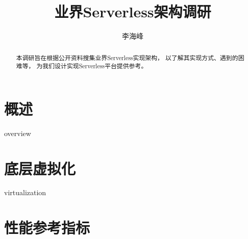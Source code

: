 \documentclass{scrartcl}
\title{业界Serverless架构调研}
\author{李海峰}
\begin{document}
\begin{titlingpage}
\maketitle
\begin{abstract}
    本调研旨在根据公开资料搜集业界Serverless实现架构，
    以了解其实现方式、遇到的困难等，
    为我们设计实现Serverless平台提供参考。
\end{abstract}
\end{titlingpage}
\tableofcontents

\section{概述}
{overview}
\section{底层虚拟化}
{virtualization}
\section{性能参考指标}

\clearpage
\printbibliography 
\end{document}
